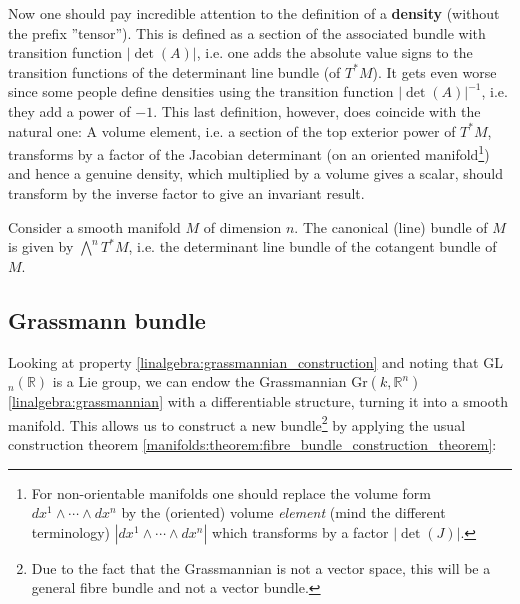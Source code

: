     \begin{remark}[Densities]
        Now one should pay incredible attention to the definition of a \textbf{density} (without the prefix ''tensor''). This is defined as a section of the associated bundle with transition function $|\det(A)|$, i.e. one adds the absolute value signs to the transition functions of the determinant line bundle (of $T^*M$). It gets even worse since some people define densities using the transition function $|\det(A)|^{-1}$, i.e. they add a power of $-1$. This last definition, however, does coincide with the natural one: A volume element, i.e. a section of the top exterior power of $T^*M$, transforms by a factor of the Jacobian determinant (on an oriented manifold\footnote{For non-orientable manifolds one should replace the volume form $dx^1\wedge\cdots\wedge dx^n$ by the (oriented) volume \textit{element} (mind the different terminology) $|dx^1\wedge\cdots\wedge dx^n|$ which transforms by a factor $|\det(J)|$.}) and hence a genuine density, which multiplied by a volume gives a scalar, should transform by the inverse factor to give an invariant result.
    \end{remark}

    \begin{example}
        Consider a smooth manifold $M$ of dimension $n$. The canonical (line) bundle of $M$ is given by $\bigwedge^nT^*M$, i.e. the determinant line bundle of the cotangent bundle of $M$.
    \end{example}

\subsection{Grassmann bundle}

    Looking at property \ref{linalgebra:grassmannian_construction} and noting that GL$_n(\mathbb{R})$ is a Lie group, we can endow the Grassmannian Gr$(k, \mathbb{R}^n)$ \ref{linalgebra:grassmannian} with a differentiable structure, turning it into a smooth manifold. This allows us to construct a new bundle\footnote{Due to the fact that the Grassmannian is not a vector space, this will be a general fibre bundle and not a vector bundle.} by applying the usual construction theorem \ref{manifolds:theorem:fibre_bundle_construction_theorem}:

